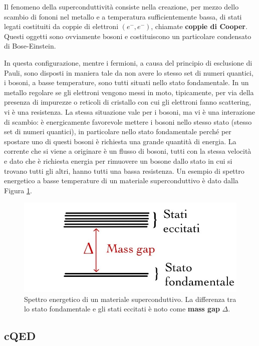 \noindent Il fenomeno della superconduttività consiste nella creazione, per mezzo dello scambio di fononi nel metallo e a temperatura sufficientemente bassa, di stati legati costituiti da coppie di elettroni $(e^-,e^-)$, chiamate \textbf{coppie di Cooper}. Questi oggetti sono ovviamente bosoni e costituiscono un particolare condensato di Bose-Einstein.

\noindent In questa configurazione, mentre i fermioni, a causa del principio di esclusione di Pauli, sono disposti in maniera tale da non avere lo stesso set di numeri quantici, i bosoni, a basse temperature, sono tutti situati nello stato fondamentale. In un metallo regolare se gli elettroni vengono messi in moto, tipicamente, per via della presenza di impurezze o reticoli di cristallo con cui gli elettroni fanno scattering, vi è una resistenza. La stessa situazione vale per i bosoni, ma vi è una interazione di scambio: è energicamente favorevole mettere i bosoni nello stesso stato (stesso set di numeri quantici), in particolare nello stato fondamentale perché per spostare uno di questi bosoni è richiesta una grande quantità di energia. La corrente che si viene a originare è un flusso di bosoni, tutti con la stessa velocità e dato che è richiesta energia per rimuovere un bosone dallo stato in cui si trovano tutti gli altri, hanno tutti una bassa resistenza. Un esempio di spettro energetico a basse temperature di un materiale superconduttivo è dato dalla Figura \ref{fig:super-spectrum}.

\begin{figure}[!ht]
    \centering
    \includegraphics[scale=0.45]{images/super-spectrum.jpg}
    \caption{Spettro energetico di un materiale superconduttivo. La differenza tra lo stato fondamentale e gli stati eccitati è noto come \textbf{mass gap} $\Delta$.}
    \label{fig:super-spectrum}
\end{figure}


\subsection{cQED}

